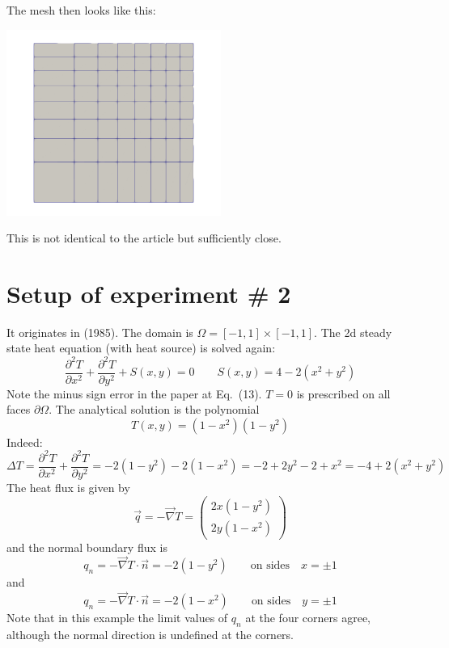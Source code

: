 The mesh then looks like this:

\begin{center}
\includegraphics[width=7cm]{python_codes/fieldstone_173/images/mesh8x8}
\end{center}
This is not identical to the article but sufficiently close.


\section*{Setup of experiment \# 2}

It originates in \textcite{cacs85} (1985). The domain is $\Omega=[-1,1]\times [-1,1]$.
The 2d steady state heat equation (with heat source) is solved again:
\[
\frac{\partial^2 T}{\partial x^2} + \frac{\partial^2 T}{\partial y^2} + S(x,y) = 0
\qquad
S(x,y)=4-2(x^2+y^2)
\]
Note the minus sign error in the paper at Eq.~(13).
$T=0$ is prescribed on all faces $\partial \Omega$.
The analytical solution is the polynomial
\[
T(x,y)=(1-x^2)(1-y^2)
\]
Indeed:
\[
\Delta T = \frac{\partial^2 T}{\partial x^2} + \frac{\partial^2 T}{\partial y^2}
= -2(1-y^2) -2(1-x^2)
= -2 + 2y^2 -2 + x^2
= -4 + 2(x^2+y^2)
\]
The heat flux is given by 
\[
\vec{q} = -\vec\nabla T = 
\left(
\begin{array}{c}
2x(1-y^2) \\
2y(1-x^2)
\end{array}
\right)
\]
and the normal boundary flux is 
\[
{q}_n=-\vec\nabla T \cdot \vec{n}=-2(1-y^2) \qquad \text{on sides} \quad x=\pm 1
\]
and
\[
{q}_n=-\vec\nabla T \cdot \vec{n}=-2(1-x^2) \qquad \text{on sides} \quad y=\pm 1
\]
Note that in this example the limit values of $q_n$ at the four corners agree, 
although the normal direction is undefined at the corners.

